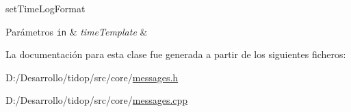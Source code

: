 set\+Time\+Log\+Format 


 
\begin{DoxyParams}[1]{Parámetros}
\mbox{\tt in}  & {\em time\+Template} & \\
\hline
\end{DoxyParams}


La documentación para esta clase fue generada a partir de los siguientes ficheros\+:\begin{DoxyCompactItemize}
\item 
D\+:/\+Desarrollo/tidop/src/core/\hyperlink{messages_8h}{messages.\+h}\item 
D\+:/\+Desarrollo/tidop/src/core/\hyperlink{messages_8cpp}{messages.\+cpp}\end{DoxyCompactItemize}
